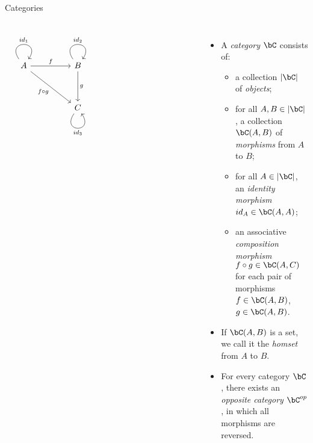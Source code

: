 \begin{frame}[fragile]{Categories}
\begin{columns}
\[\begin{tikzcd}
	A && B \\
	\\
	&& C &&&&& {}
	\arrow["{id_1}", from=1-1, to=1-1, loop, in=55, out=125, distance=10mm]
	\arrow["f", from=1-1, to=1-3]
	\arrow["{f \circ g}"', from=1-1, to=3-3]
	\arrow["{id_2}", from=1-3, to=1-3, loop, in=55, out=125, distance=10mm]
	\arrow["g", from=1-3, to=3-3]
	\arrow["{id_3}"', from=3-3, to=3-3, loop, in=305, out=235, distance=10mm]
\end{tikzcd}\]
\begin{itemize}
 \item


A \textit{category} $\bC$ consists of:
\begin{itemize}
 \pause\item a collection $|\bC|$ of \textit{objects};
 \pause\item for all $A, B \in |\bC|$, a collection $\bC(A, B)$ of \textit{morphisms} from $A$ to $B$;
 \pause\item for all $A \in |\bC|$, an \textit{identity morphism} $id_A \in \bC(A, A)$;
 \pause\item an associative \textit{composition morphism} $f \circ g \in \bC(A,C)$ for each pair of morphisms $f \in \bC(A,B)$, $g \in \bC(A,B)$.
\end{itemize}
\pause\item If $\bC(A, B)$ is a set, we call it the \textit{homset} from $A$ to $B$.
\pause\item For every category $\bC$, there exists an \textit{opposite category} $\bC^{op}$, in which all morphisms are reversed.
\end{itemize}
\end{columns}
\end{frame}

